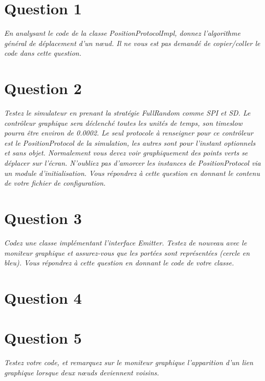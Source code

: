 \documentclass[11pt,a4paper,sans]{report}
\begin{document}
\section{Question 1}
\textit{En analysant le code de la classe PositionProtocolImpl, donnez l’algorithme général de déplacement d’un nœud. Il ne vous est pas demandé de copier/coller le code dans cette question.}




\section{Question 2}
\textit{Testez le simulateur en prenant la stratégie FullRandom comme SPI et SD. Le contrôleur graphique sera déclenché toutes les unités de temps, son timeslow pourra être environ de 0.0002. Le seul protocole à renseigner pour ce contrôleur est le PositionProtocol de la simulation, les autres sont pour l’instant optionnels et sans objet.  Normalement vous devez voir graphiquement des points verts se déplacer sur l’écran.  N’oubliez pas d’amorcer les instances de PositionProtocol via un module d’initialisation. Vous répondrez à cette question en donnant le contenu de votre fichier de configuration.}

\section{Question 3}
\textit{Codez une classe implémentant l’interface Emitter. Testez de nouveau avec le moniteur graphique et assurez-vous que les portées sont représentées (cercle en bleu).  Vous répondrez à cette question en donnant le code de votre classe.}

%


\section{Question 4}

\section{Question 5}
\textit{Testez votre code, et remarquez sur le moniteur graphique l’apparition d’un lien graphique lorsque deux nœuds deviennent voisins.} %
\end{document}
